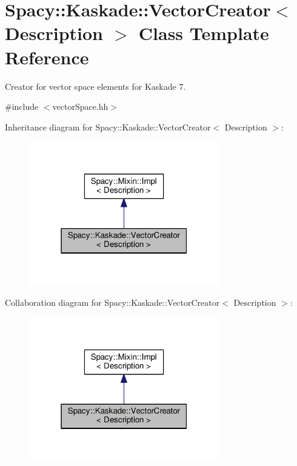 \hypertarget{classSpacy_1_1Kaskade_1_1VectorCreator}{}\section{Spacy\+:\+:Kaskade\+:\+:Vector\+Creator$<$ Description $>$ Class Template Reference}
\label{classSpacy_1_1Kaskade_1_1VectorCreator}


Creator for vector space elements for Kaskade 7.  




{\ttfamily \#include $<$vector\+Space.\+hh$>$}



Inheritance diagram for Spacy\+:\+:Kaskade\+:\+:Vector\+Creator$<$ Description $>$\+:\nopagebreak
\begin{figure}[H]
\begin{center}
\leavevmode
\includegraphics[width=235pt]{classSpacy_1_1Kaskade_1_1VectorCreator__inherit__graph}
\end{center}
\end{figure}


Collaboration diagram for Spacy\+:\+:Kaskade\+:\+:Vector\+Creator$<$ Description $>$\+:\nopagebreak
\begin{figure}[H]
\begin{center}
\leavevmode
\includegraphics[width=235pt]{classSpacy_1_1Kaskade_1_1VectorCreator__coll__graph}
\end{center}
\end{figure}
